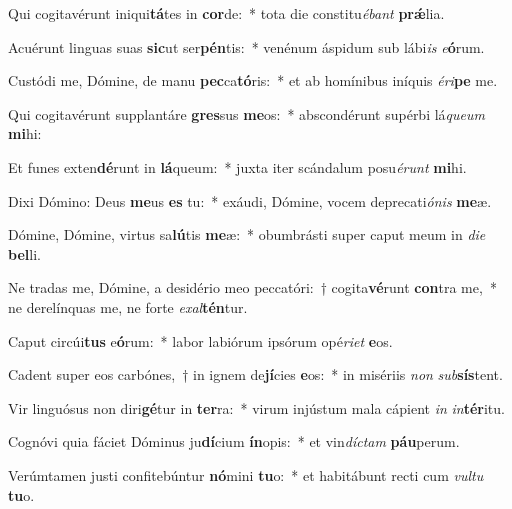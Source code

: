 \item Qui cogitavérunt iniqui\textbf{tá}tes in \textbf{cor}de:~* tota die constitu\textit{é}\textit{bant} \textbf{prǽ}lia.
\item Acuérunt linguas suas \textbf{sic}ut ser\textbf{pén}tis:~* venénum áspidum sub lábi\textit{is} \textit{e}\textbf{ó}rum.
\item Custódi me, Dómine, de manu \textbf{pec}ca\textbf{tó}ris:~* et ab homínibus iníquis \textit{é}\textit{ri}\textbf{pe} me.
\item Qui cogitavérunt supplantáre \textbf{gres}sus \textbf{me}os:~* abscondérunt supérbi lá\textit{que}\textit{um} \textbf{mi}hi:
\item Et funes exten\textbf{dé}runt in \textbf{lá}queum:~* juxta iter scándalum posu\textit{é}\textit{runt} \textbf{mi}hi.
\item Dixi Dómino: Deus \textbf{me}us \textbf{es} tu:~* exáudi, Dómine, vocem deprecati\textit{ó}\textit{nis} \textbf{me}æ.
\item Dómine, Dómine, virtus sa\textbf{lú}tis \textbf{me}æ:~* obumbrásti super caput meum in \textit{di}\textit{e} \textbf{bel}li.
\item Ne tradas me, Dómine, a desidério meo peccatóri:~† cogita\textbf{vé}runt \textbf{con}tra me,~* ne derelínquas me, ne forte \textit{ex}\textit{al}\textbf{tén}tur.
\item Caput circúi\textbf{tus} e\textbf{ó}rum:~* labor labiórum ipsórum opé\textit{ri}\textit{et} \textbf{e}os.
\item Cadent super eos carbónes,~† in ignem de\textbf{jí}cies \textbf{e}os:~* in misériis \textit{non} \textit{sub}\textbf{sís}tent.
\item Vir linguósus non diri\textbf{gé}tur in \textbf{ter}ra:~* virum injústum mala cápient \textit{in} \textit{in}\textbf{tér}itu.
\item Cognóvi quia fáciet Dóminus ju\textbf{dí}cium \textbf{ín}opis:~* et vin\textit{díc}\textit{tam} \textbf{páu}perum.
\item Verúmtamen justi confitebúntur \textbf{nó}mini \textbf{tu}o:~* et habitábunt recti cum \textit{vul}\textit{tu} \textbf{tu}o.
